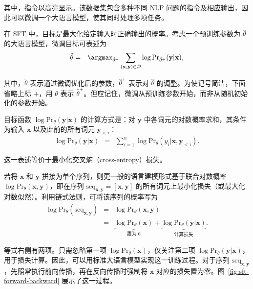 \noindent 其中，指令以高亮显示。该数据集包含多种不同 NLP 问题的指令及相应输出，因此可以微调一个大语言模型，使其同时处理多项任务。

在 SFT 中，目标是最大化给定输入时正确输出的概率。考虑一个预训练参数为 $\hat{\theta}$ 的大语言模型，微调目标可表述为
\begin{eqnarray}
\tilde{\theta} & = & \argmax_{\hat{\theta}^+} \sum_{(\mathbf{x},\mathbf{y}) \in \mathcal{D}} \log \mathrm{Pr}_{\hat{\theta}^+}(\mathbf{y}|\mathbf{x}), \label{eq:instruction-fine-tuning}
\end{eqnarray}

\noindent 其中，$\tilde{\theta}$ 表示通过微调优化后的参数，$\hat{\theta}^+$ 表示对 $\hat{\theta}$ 的调整。为使记号简洁，下面省略上标 $+$，用 $\theta$ 表示 $\hat{\theta}^+$。但应记住，微调从预训练参数开始，而非从随机初始化的参数开始。

目标函数 $\log \mathrm{Pr}_{\theta}(\mathbf{y}|\mathbf{x})$ 的计算方式是：对 $\mathbf{y}$ 中各词元的对数概率求和，其条件为输入 $\mathbf{x}$ 以及此前的所有词元 $\mathbf{y}_{<i}$：
\begin{eqnarray}
\log \mathrm{Pr}_{\theta}(\mathbf{y}|\mathbf{x}) & = & \sum_{i=1}^{n} \log \mathrm{Pr}_{\theta}(y_i|\mathbf{x},\mathbf{y}_{<i}).
\end{eqnarray}

\noindent 这一表述等价于最小化交叉熵（cross-entropy）损失。

若将 $\mathbf{x}$ 和 $\mathbf{y}$ 拼接为单个序列，则更一般的语言建模形式基于联合对数概率 $\log \mathrm{Pr}_{\theta}(\mathbf{x},\mathbf{y})$，即在序列 $\mathrm{seq}_{\mathbf{x},\mathbf{y}} = [\mathbf{x},\mathbf{y}]$ 的所有词元上最小化损失（或最大化对数似然）。利用链式法则，可将该序列的概率写为
\begin{eqnarray}
\log \mathrm{Pr}_{\theta}(\mathrm{seq}_{\mathbf{x},\mathbf{y}}) & = & \log \mathrm{Pr}_{\theta}(\mathbf{x},\mathbf{y}) \nonumber \\
 & = & \underbrace{\log \mathrm{Pr}_{\theta}(\mathbf{x})}_{\text{置为 $0$}} + \underbrace{\log \mathrm{Pr}_{\theta}(\mathbf{y}|\mathbf{x})}_{\text{计算损失}}. \label{eq:sft-xy-chain-rule}
\end{eqnarray}

\noindent 等式右侧有两项。只需忽略第一项 $\log \mathrm{Pr}_{\theta}(\mathbf{x})$，仅关注第二项 $\log \mathrm{Pr}_{\theta}(\mathbf{y}|\mathbf{x})$，用于损失计算。因此，可以用标准大语言模型实现这一训练过程。对于序列 $\mathrm{seq}_{\mathbf{x},\mathbf{y}}$，先照常执行前向传播，再在反向传播时强制将 $\mathbf{x}$ 对应的损失置为零。图~\ref{fig:sft-forward-backward} 展示了这一过程。

